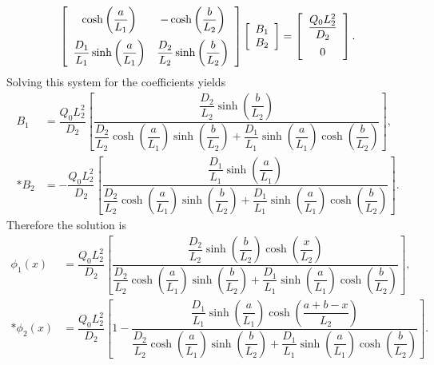 \begin{align}
  \left[ \begin{array}{c c}
  \cosh \left( \dfrac{a}{L_1} \right)                  & - \cosh \left( \dfrac{b}{L_2} \right) \vspace{0.2cm} \\
  \dfrac{D_1}{L_1} \sinh \left( \dfrac{a}{L_1} \right) & \dfrac{D_2}{L_2} \sinh \left( \dfrac{b}{L_2} \right) \\
  \end{array} \right]
  \left[ \begin{array}{c} B_1 \\ B_2 \\ \end{array} \right] =
  \left[ \begin{array}{c} \dfrac{Q_0 L_2^2}{D_2} \vspace{0.2cm} \\ 0 \end{array} \right] .
\end{align}
Solving this system for the coefficients yields
\begin{subequations}
\begin{align}
  B_1 &= \dfrac{Q_0 L_2^2}{D_2} \left[
         \dfrac{ \dfrac{D_2}{L_2} \sinh \left( \dfrac{b}{L_2} \right) }
               { \dfrac{D_2}{L_2} \cosh \left( \dfrac{a}{L_1} \right) \sinh  \left( \dfrac{b}{L_2} \right)
               + \dfrac{D_1}{L_1} \sinh \left( \dfrac{a}{L_1} \right) \cosh  \left( \dfrac{b}{L_2} \right) } \right], \\*
  B_2 &= -\dfrac{Q_0 L_2^2}{D_2} \left[
         \dfrac{ \dfrac{D_1}{L_1} \sinh \left( \dfrac{a}{L_1} \right) }
               { \dfrac{D_2}{L_2} \cosh \left( \dfrac{a}{L_1} \right) \sinh  \left( \dfrac{b}{L_2} \right)
               + \dfrac{D_1}{L_1} \sinh \left( \dfrac{a}{L_1} \right) \cosh  \left( \dfrac{b}{L_2} \right) } \right].
\end{align}
\end{subequations}
Therefore the solution is
\begin{subequations}
\begin{align}
  \phi_1(x) &= \dfrac{Q_0 L_2^2}{D_2} \left[
         \dfrac{ \dfrac{D_2}{L_2} \sinh \left( \dfrac{b}{L_2} \right) \cosh \left( \dfrac{x}{L_2} \right) }
               { \dfrac{D_2}{L_2} \cosh \left( \dfrac{a}{L_1} \right) \sinh  \left( \dfrac{b}{L_2} \right)
               + \dfrac{D_1}{L_1} \sinh \left( \dfrac{a}{L_1} \right) \cosh  \left( \dfrac{b}{L_2} \right) } \right] , \\*
  \phi_2(x) &= \dfrac{Q_0 L_2^2}{D_2} \left[ 1 -
                \dfrac{ \dfrac{D_1}{L_1} \sinh \left( \dfrac{a}{L_1} \right) \cosh \left( \dfrac{a+b-x}{L_2} \right) }
               { \dfrac{D_2}{L_2} \cosh \left( \dfrac{a}{L_1} \right) \sinh  \left( \dfrac{b}{L_2} \right)
               + \dfrac{D_1}{L_1} \sinh \left( \dfrac{a}{L_1} \right) \cosh  \left( \dfrac{b}{L_2} \right) } \right] .
\end{align}
\end{subequations}

